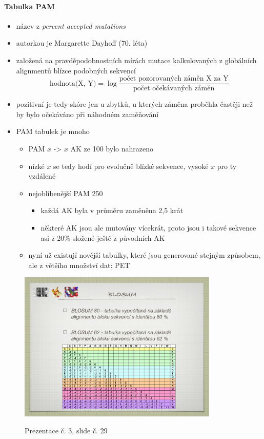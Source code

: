 \documentclass[DIV=8]{scrreprt}
\begin{document}
\paragraph{Tabulka PAM}
\begin{itemize}[nosep]
    \item název z \emph{percent accepted mutations}
    \item autorkou je Margarette Dayhoff (70. léta)
    \item založená na pravděpodobnostních mírách mutace kalkulovaných z globálních alignmentů blízce podobných sekvencí
\[\text{hodnota(X, Y)} = \log \frac{\text{počet pozorovaných záměn X za Y}}{\text{počet očekávaných záměn}}\]
    \item pozitivní je tedy skóre jen u zbytků, u kterých záměna proběhla častěji než by bylo očekáváno při náhodném zaměňování
    \item PAM tabulek je mnoho
\begin{itemize}[nosep]
    \item PAM \(x\) -> \(x\) AK ze 100 bylo nahrazeno
    \item nízké \(x\) se tedy hodí pro evolučně blízké sekvence, vysoké \(x\) pro ty vzdálené
    \item nejoblíbenější PAM 250
\begin{itemize}[nosep]
    \item každá AK byla v průměru zaměněna 2,5 krát
    \item některé AK jsou ale mutovány vícekrát, proto jsou i takové sekvence asi z 20\% složené ještě z původních AK
\end{itemize}

    \item nyní už existují novější tabulky, které jsou generované stejným způsobem, ale z většího množství dat: PET
\end{itemize}

\end{itemize}



\begin{figure}
    \caption{Prezentace č. 3, slide č. 29}
    \includegraphics[width=0.85\textwidth]{slides-3/slide-29.jpg}
    \centering
    \label{slides-3-slide-29}
\end{figure}
\end{document}
